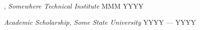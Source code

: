 , 
\textit{Somewhere Technical Institute} 
\hfill	MMM YYYY


\textit{Academic Scholarship, Some State University} 
\hfill	YYYY --- YYYY
